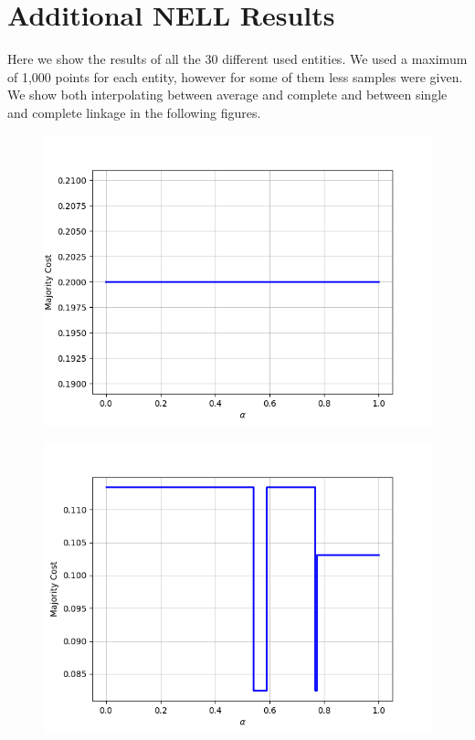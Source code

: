 \chapter{Additional NELL Results}
\label{app:nell}

Here we show the results of all the 30 different used entities. We used a maximum of 1,000 points for each entity, however for some of them less samples were given. We show both interpolating between average and complete and between single and complete linkage in the following figures.

\begin{figure}[h]
\centering
\begin{minipage}{.24\textwidth}
  \centering
  {\includegraphics[width=\linewidth]{plots/nell-ac/animal}}
\end{minipage}
\begin{minipage}{.24\textwidth}
  \centering
  {\includegraphics[width=\linewidth]{plots/nell-ac/arthropod}}

\end{minipage}
\end{figure}
